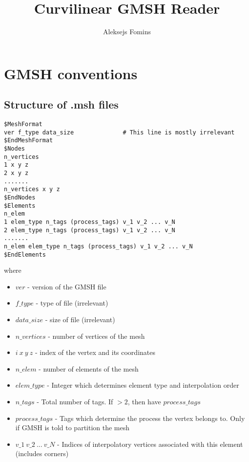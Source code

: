 \documentclass[12pt]{article}
\title{Curvilinear GMSH Reader}
\author{Aleksejs Fomins}
\date{}
\begin{document}
 


\maketitle 

\section{GMSH conventions}

\subsection{Structure of .msh files}

\begin{mybox}
\begin{lstlisting}
$MeshFormat
ver f_type data_size              # This line is mostly irrelevant
$EndMeshFormat
$Nodes
n_vertices
1 x y z
2 x y z
.......
n_vertices x y z
$EndNodes
$Elements
n_elem
1 elem_type n_tags (process_tags) v_1 v_2 ... v_N
2 elem_type n_tags (process_tags) v_1 v_2 ... v_N
.......
n_elem elem_type n_tags (process_tags) v_1 v_2 ... v_N
$EndElements
\end{lstlisting}
\end{mybox}

\noindent
where
\begin{itemize}
	\item $ver$             - version of the GMSH file
	\item $f\_type$          - type of file (irrelevant)
	\item $data\_size$       - size of file (irrelevant)
	\item $n\_vertices$      - number of vertices of the mesh
	\item $i\ x\ y\ z$         - index of the vertex and its coordinates
	\item $n\_elem$          - number of elements of the mesh
	\item $elem\_type$       - Integer which determines element type and interpolation order
	\item $n\_tags$          - Total number of tags. If $>2$, then have $process\_tags$
	\item $process\_tags$    - Tags which determine the process the vertex belongs to. Only if GMSH is told to partition the mesh
	\item $v\_1\ v\_2\ ...\ v\_N$ - Indices of interpolatory vertices associated with this element (includes corners)
\end{itemize}
\end{document}
